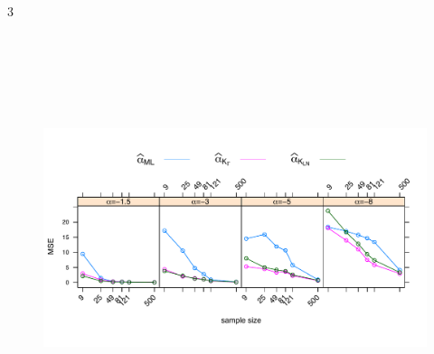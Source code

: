 \documentclass[a0,portrait]{a0poster}
\begin{document}
\begin{parcolumns}[colwidths={1=.3\textwidth,2=.39\textwidth},rulebetweencolor=blue
	,rulebetween=true]{3}
{\begin{minipage}[t]{1\linewidth}
	
\begin{center}
	\begin{minipage}[t]{1\linewidth}
	\begin{figure}
		\includegraphics[width=20cm, height=12cm]{../../../../Figures/IVJIAAIS2017/Cont/ECM_500_L3MVconX0yGAyLN_OPTIM_hasta500_MOM1_2_SinCte_Ver2FINALeps05.pdf}
		\end{figure}
	\end{minipage}
\end{center}

\end{minipage}
}


\end{parcolumns}
\end{document}
